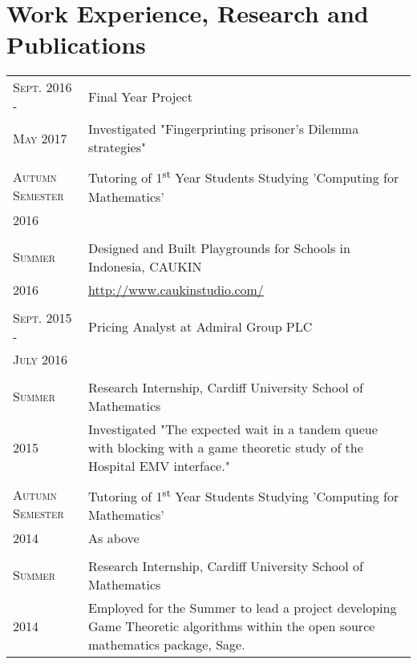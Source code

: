 \documentclass[a4paper]{article}
\begin{document}
\section{Work Experience, Research and Publications}
\begin{tabularx}{\textwidth}{lX}

\textsc{Sept. 2016 - } & Final Year Project \\
\textsc{May 2017} & \footnotesize{Investigated "Fingerprinting prisoner’s Dilemma strategies"}
\\
\\
\textsc{Autumn Semester} & Tutoring of 1\textsuperscript{st} Year Students Studying 'Computing for Mathematics'\\
\textsc{2016} & \footnotesize{}
\\
\\
\textsc{Summer} & Designed and Built Playgrounds for Schools in Indonesia, CAUKIN \\
\textsc{2016} & \footnotesize{\url{http://www.caukinstudio.com/}}
\\
\\
\textsc{Sept. 2015 -} & Pricing Analyst at Admiral Group PLC \\
\textsc{July 2016} & \footnotesize{}
\\
\\
\textsc{Summer} & Research Internship, Cardiff University School of Mathematics \\
\textsc{2015} & \footnotesize{Investigated "The expected wait in a tandem queue with blocking with a game theoretic study of the Hospital EMV interface."}
\\
\\
\textsc{Autumn Semester} & Tutoring of 1\textsuperscript{st} Year Students Studying 'Computing for Mathematics'\\
\textsc{2014} & \footnotesize{As above}
\\
\\
\textsc{Summer} & Research Internship, Cardiff University School of Mathematics \\
\textsc{2014} & \footnotesize{Employed for the Summer to lead a project developing Game Theoretic algorithms within the open source mathematics package, Sage.
}
\end{tabularx}
\end{document}
